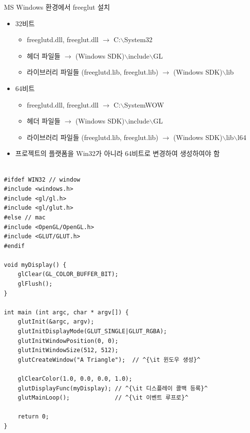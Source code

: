 \documentclass{beamer}
\begin{document}
\begin{frame}{MS Windows 환경에서 freeglut 설치}

\begin{itemize}
\item 32비트
	\begin{itemize}
	\item freeglutd.dll, freeglut.dll $\rightarrow$ C:$\backslash$System32
	\item 헤더 파일들 $\rightarrow$ (Windows SDK)$\backslash$include$\backslash$GL
	\item 라이브러리 파일들 (freeglutd.lib, freeglut.lib) $\rightarrow$ (Windows SDK)$\backslash$lib
	\end{itemize}
\end{itemize}

\begin{itemize}
\item 64비트
	\begin{itemize}
	\item freeglutd.dll, freeglut.dll $\rightarrow$ C:$\backslash$SystemWOW
	\item 헤더 파일들 $\rightarrow$ (Windows SDK)$\backslash$include$\backslash$GL
	\item 라이브러리 파일들 (freeglutd.lib, freeglut.lib) $\rightarrow$ (Windows SDK)$\backslash$lib$\backslash$l64
	\end{itemize}
\item 프로젝트의 플랫폼을 Win32가 아니라 64비트로 변경하여 생성하여야 함
\end{itemize}

\end{frame}


\begin{algorithmbis}\label{code:OGL_opengl:example}
\lstset{language=C++, escapechar=^} 
\begin{lstlisting}

#ifdef WIN32 // window 
#include <windows.h>
#include <gl/gl.h>
#include <gl/glut.h>
#else // mac
#include <OpenGL/OpenGL.h>
#include <GLUT/GLUT.h>
#endif

void myDisplay() {
    glClear(GL_COLOR_BUFFER_BIT);
    glFlush();    
}

int main (int argc, char * argv[]) {
    glutInit(&argc, argv);
    glutInitDisplayMode(GLUT_SINGLE|GLUT_RGBA);
    glutInitWindowPosition(0, 0);
    glutInitWindowSize(512, 512);
    glutCreateWindow("A Triangle");  // ^{\it 윈도우 생성}^

    glClearColor(1.0, 0.0, 0.0, 1.0);
    glutDisplayFunc(myDisplay);	// ^{\it 디스플레이 콜백 등록}^
    glutMainLoop();				// ^{\it 이벤트 루프로}^

    return 0;
}
\end{lstlisting}
\end{algorithmbis}

\end{document}
